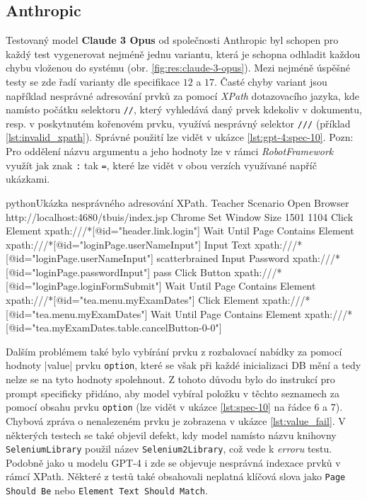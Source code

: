 \documentclass[czech, ma, kiv, he, iso690alph, pdf, viewonly]{fasthesis}
\begin{document}
        \subsection{Anthropic} \label{sec:res:anthropic}

            Testovaný model \textbf{Claude 3 Opus} od společnosti Anthropic byl schopen pro každý test vygenerovat nejméně jednu variantu, která je schopna odhladit každou chybu vloženou do systému (obr. \ref{fig:res:claude-3-opus}). Mezi nejméně úspěšné testy se zde řadí varianty dle specifikace \(12\) a \(17\). Časté chyby variant jsou například nesprávné adresování prvků za pomocí \textit{XPath} dotazovacího jazyka, kde namísto počátku selektoru \verb|//|, který vyhledává daný prvek kdekoliv v dokumentu, resp. v poskytnutém kořenovém prvku, využívá nesprávný selektor \verb|///| (příklad \ref{lst:invalid_xpath}). Správné použití lze vidět v ukázce \ref{lst:gpt-4:spec-10}. Pozn: Pro oddělení názvu argumentu a jeho hodnoty lze v rámci \textit{RobotFramework} využít jak znak \verb|:| tak \verb|=|, které lze vidět v obou verzích využívané napříč ukázkami.

            \begin{code}{python}{Ukázka nesprávného adresování XPath. \label{lst:invalid_xpath}}
Teacher Scenario
    Open Browser    http://localhost:4680/tbuis/index.jsp    Chrome
    Set Window Size    1501    1104
    Click Element    xpath:///*[@id="header.link.login"]
    Wait Until Page Contains Element    xpath:///*[@id="loginPage.userNameInput"]
    Input Text    xpath:///*[@id="loginPage.userNameInput"]    scatterbrained
    Input Password    xpath:///*[@id="loginPage.passwordInput"]    pass
    Click Button    xpath:///*[@id="loginPage.loginFormSubmit"]
    Wait Until Page Contains Element    xpath:///*[@id="tea.menu.myExamDates"]
    Click Element    xpath:///*[@id="tea.menu.myExamDates"]
    Wait Until Page Contains Element    xpath:///*[@id="tea.myExamDates.table.cancelButton-0-0"]
            \end{code}

            Dalším problémem také bylo vybírání prvku z rozbalovací nabídky za pomocí hodnoty \varb|value| prvku \verb|option|, které se však při každé inicializaci DB mění a tedy nelze se na tyto hodnoty spolehnout. Z tohoto důvodu bylo do instrukcí pro prompt specificky přidáno, aby model vybíral položku v těchto seznamech za pomocí obsahu prvku \verb|option| (lze vidět v ukázce \ref{lst:spec-10} na řádce 6 a 7). Chybová zpráva o nenalezeném prvku je zobrazena v ukázce \ref{lst:value_fail}. V některých testech se také objevil defekt, kdy model namísto názvu knihovny \verb|SeleniumLibrary| použil název \verb|Selenium2Library|, což vede k \textit{erroru} testu. Podobně jako u modelu GPT-4 i zde se objevuje nesprávná indexace prvků v rámcí XPath. Některé z testů také obsahovali neplatná klíčová slova jako \verb|Page Should Be| nebo \verb|Element Text Should Match|.
\end{document}
